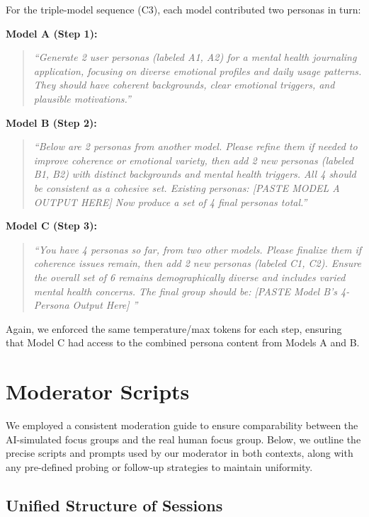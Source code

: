 \documentclass[acmsmall]{acmart}
\begin{document}
For the triple-model sequence (C3), each model contributed two personas in turn:

\noindent\textbf{Model A (Step 1):}
\begin{quote}
\emph{``Generate 2 user personas (labeled A1, A2) for a mental health journaling application, focusing on diverse emotional profiles and daily usage patterns. 
They should have coherent backgrounds, clear emotional triggers, and plausible motivations.''}
\end{quote}

\noindent\textbf{Model B (Step 2):}
\begin{quote}
\emph{``Below are 2 personas from another model. Please refine them if needed to improve coherence or emotional variety, 
then add 2 new personas (labeled B1, B2) with distinct backgrounds and mental health triggers. 
All 4 should be consistent as a cohesive set.
Existing personas:
[PASTE MODEL A OUTPUT HERE]
Now produce a set of 4 final personas total.''}
\end{quote}

\noindent\textbf{Model C (Step 3):}
\begin{quote}
\emph{``You have 4 personas so far, from two other models. 
Please finalize them if coherence issues remain, then add 2 new personas (labeled C1, C2). 
Ensure the overall set of 6 remains demographically diverse and includes varied mental health concerns. 
The final group should be:
[PASTE Model B's 4-Persona Output Here]
''}
\end{quote}

Again, we enforced the same temperature/max tokens for each step, ensuring that Model C had access to the combined persona content from Models A and B.


\section{Moderator Scripts}

We employed a consistent moderation guide to ensure comparability between the AI-simulated focus groups and the real human focus group. Below, we outline the precise scripts and prompts used by our moderator in both contexts, along with any pre-defined probing or follow-up strategies to maintain uniformity.

\subsection{Unified Structure of Sessions}
\end{document}
